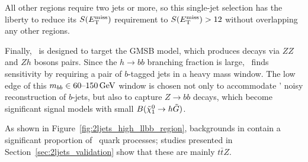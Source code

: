 All other regions require two jets or more, so this single-jet selection has
the liberty to reduce its $\metsig$ requirement to $\metsig > 12$
without overlapping any other regions.

Finally, \srllbb\ is designed to target the GMSB model, which produces decays
via $ZZ$ and $Zh$ bosons pairs.
Since the $h\rightarrow bb$ branching fraction is large, \srllbb\ finds
sensitivity by requiring a pair of $b$-tagged jets in a heavy mass window.
The low edge of this $\mbb \in 60\textrm{--}150\,\eV[G]$ window is chosen not
only to accommodate \atlas' noisy reconstruction of $b$-jets, but also to
capture $Z\rightarrow bb$ decays, which become significant signal models with
small $B(\neutralino_1 \rightarrow h \gravitino)$.

As shown in Figure~\ref{fig:2ljets_high_llbb_region}, backgrounds in \srllbb
contain a significant proportion of \topother\ quark processes;
studies presented in Section~\ref{sec:2ljets_validation} show that these are
mainly $t\bar t Z$.

